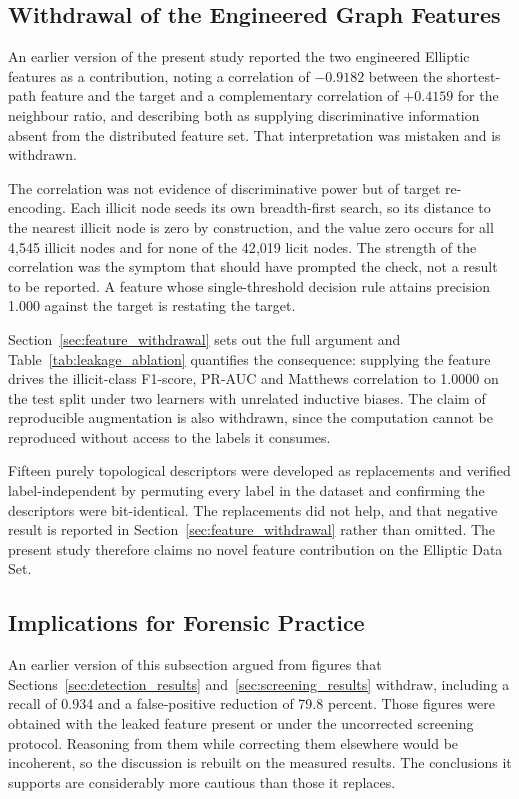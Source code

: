 \documentclass[12pt,a4paper]{article}
\begin{document}
\subsection{Withdrawal of the Engineered Graph Features}
\label{sec:feature_discussion}

An earlier version of the present study reported the two
engineered Elliptic features as a contribution, noting a
correlation of $-0.9182$ between the shortest-path feature and
the target and a complementary correlation of $+0.4159$ for the
neighbour ratio, and describing both as supplying discriminative
information absent from the distributed feature set. That
interpretation was mistaken and is withdrawn.

The correlation was not evidence of discriminative power but of
target re-encoding. Each illicit node seeds its own
breadth-first search, so its distance to the nearest illicit node
is zero by construction, and the value zero occurs for all 4{,}545
illicit nodes and for none of the 42{,}019 licit nodes. The
strength of the correlation was the symptom that should have
prompted the check, not a result to be reported. A feature whose
single-threshold decision rule attains precision 1.000 against
the target is restating the target.

Section~\ref{sec:feature_withdrawal} sets out the full argument
and Table~\ref{tab:leakage_ablation} quantifies the consequence:
supplying the feature drives the illicit-class F1-score, PR-AUC
and Matthews correlation to 1.0000 on the test split under two
learners with unrelated inductive biases. The claim of
reproducible augmentation is also withdrawn, since the
computation cannot be reproduced without access to the labels it
consumes.

Fifteen purely topological descriptors were developed as
replacements and verified label-independent by permuting every
label in the dataset and confirming the descriptors were
bit-identical. The replacements did not help, and that negative
result is reported in Section~\ref{sec:feature_withdrawal}
rather than omitted. The present study therefore claims no novel
feature contribution on the Elliptic Data Set.


\subsection{Implications for Forensic Practice}
\label{sec:policy}

An earlier version of this subsection argued from figures that
Sections~\ref{sec:detection_results} and~\ref{sec:screening_results}
withdraw, including a recall of 0.934 and a false-positive
reduction of 79.8 percent. Those figures were obtained with the
leaked feature present or under the uncorrected screening
protocol. Reasoning from them while correcting them elsewhere
would be incoherent, so the discussion is rebuilt on the measured
results. The conclusions it supports are considerably more
cautious than those it replaces.
\end{document}
